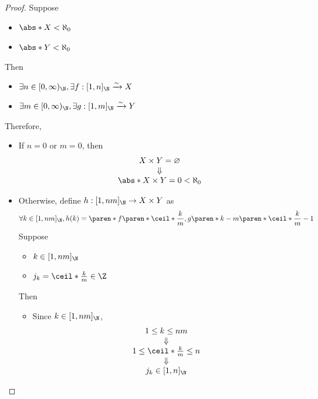 \begin{proof}
  Suppose
  \begin{itemize}
    \item $\abs*{X} < \aleph_{0}$
    \item $\abs*{Y} < \aleph_{0}$
  \end{itemize}
  Then
  \begin{itemize}
    \item $\exists n \in [0, \infty)_{\N}, \exists f: [1, n]_{\N} \xrightarrow{\sim} X$
    \item $\exists m \in [0, \infty)_{\N}, \exists g: [1, m]_{\N} \xrightarrow{\sim} Y$
  \end{itemize}
  Therefore,
  \begin{itemize}
    \item If $n = 0$ or $m = 0$, then
          \[
            \begin{array}{c}
              X \times Y = \varnothing \\
              \Downarrow               \\
              \abs*{X \times Y} = 0 < \aleph_{0}
            \end{array}
          \]
    \item Otherwise, define $h: [1, nm]_{\N} \to X \times Y$ as
          \[
            \forall k \in [1, nm]_{\N}, h(k) = \paren*{f\paren*{\ceil*{\frac{k}{m}}}, g\paren*{k - m\paren*{\ceil*{\frac{k}{m}} - 1}}}
          \]
          Suppose
          \begin{itemize}
            \item $k \in [1, nm]_{\N}$
            \item $j_{k} = \ceil*{\frac{k}{m}} \in \Z$
          \end{itemize}
          Then
          \begin{itemize}
            \item Since $k \in [1, nm]_{\N}$,
                  \[
                    \begin{array}{c}
                      1 \leq k \leq nm                  \\
                      \Downarrow                        \\
                      1 \leq \ceil*{\frac{k}{m}} \leq n \\
                      \Downarrow                        \\
                      j_{k} \in [1, n]_{\N}
                    \end{array}
                  \]

\end{itemize}
\end{itemize}
\end{proof}

